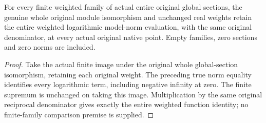 \begin{theorem}
\label{thm:scheme-global-section-weighted-norm-isometry}
\leanok
{}
For every finite weighted family of actual entire original global sections,
the genuine whole original module isomorphism and unchanged real weights
retain the entire weighted logarithmic model-norm evaluation, with the same
original denominator, at every actual original native point. Empty families,
zero sections and zero norms are included.
\end{theorem}
\begin{proof}
Take the actual finite image under the original whole global-section
isomorphism, retaining each original weight. The preceding true norm equality
identifies every logarithmic term, including negative infinity at zero.
The finite supremum is unchanged on taking this image. Multiplication by the
same original reciprocal denominator gives exactly the entire weighted
function identity; no finite-family comparison premise is supplied.
\end{proof}
